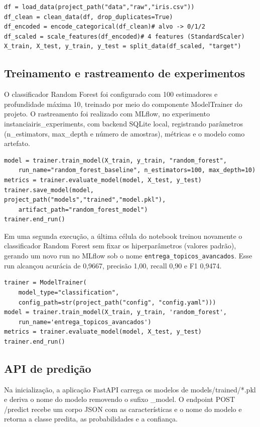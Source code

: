 \documentclass[12pt]{article}
\begin{document}
\begin{lstlisting}[breaklines=true]
df = load_data(project_path("data","raw","iris.csv"))
df_clean = clean_data(df, drop_duplicates=True)
df_encoded = encode_categorical(df_clean)# alvo -> 0/1/2
df_scaled = scale_features(df_encoded)# 4 features (StandardScaler)
X_train, X_test, y_train, y_test = split_data(df_scaled, "target")
\end{lstlisting}

\subsection{Treinamento e rastreamento de experimentos}
O classificador Random Forest foi configurado com 100 estimadores e profundidade máxima 10, treinado por
meio do componente ModelTrainer do projeto. O rastreamento foi realizado com MLflow, no experimento
instanciairis\_experiments, com backend SQLite local, registrando parâmetros (n\_estimators, max\_depth e
número de amostras), métricas e o modelo como artefato.

\begin{lstlisting}[breaklines=true]
model = trainer.train_model(X_train, y_train, "random_forest",
    run_name="random_forest_baseline", n_estimators=100, max_depth=10)
metrics = trainer.evaluate_model(model, X_test, y_test)
trainer.save_model(model, project_path("models","trained","model.pkl"),
    artifact_path="random_forest_model")
trainer.end_run()
\end{lstlisting}

Em uma segunda execução, a última célula do notebook treinou novamente o classificador
Random Forest sem fixar os hiperparâmetros (valores padrão), gerando um novo run no MLflow
sob o nome \texttt{entrega\_topicos\_avancados}. Esse run alcançou acurácia de 0{,}9667,
precisão 1{,}00, recall 0{,}90 e F1 0{,}9474.

\begin{lstlisting}[breaklines=true]
trainer = ModelTrainer(
    model_type="classification",
    config_path=str(project_path("config", "config.yaml")))
model = trainer.train_model(X_train, y_train, 'random_forest',
    run_name='entrega_topicos_avancados')
metrics = trainer.evaluate_model(model, X_test, y_test)
trainer.end_run()
\end{lstlisting}

\subsection{API de predição}
Na inicialização, a aplicação FastAPI carrega os modelos de models/trained/*.pkl e deriva o nome do
modelo removendo o sufixo \_model. O endpoint POST /predict recebe um corpo JSON com as características 
e o nome do modelo e retorna a classe predita, as probabilidades e a confiança.
\end{document}
